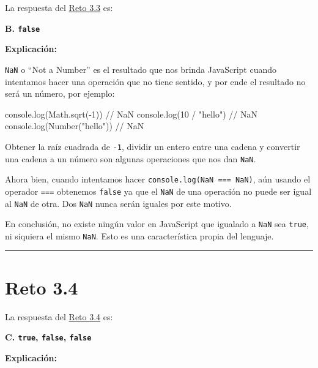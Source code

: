 \documentclass[
  letterpaper,
  DIV=11,
  numbers=noendperiod]{scrreprt}
\newenvironment{Shaded}{\begin{snugshade}}{\end{snugshade}}
\newcommand{\BuiltInTok}[1]{\textcolor[rgb]{0.00,0.23,0.31}{#1}}
\newcommand{\CommentTok}[1]{\textcolor[rgb]{0.37,0.37,0.37}{#1}}
\newcommand{\DecValTok}[1]{\textcolor[rgb]{0.68,0.00,0.00}{#1}}
\newcommand{\FunctionTok}[1]{\textcolor[rgb]{0.28,0.35,0.67}{#1}}
\newcommand{\NormalTok}[1]{\textcolor[rgb]{0.00,0.23,0.31}{#1}}
\newcommand{\OperatorTok}[1]{\textcolor[rgb]{0.37,0.37,0.37}{#1}}
\newcommand{\StringTok}[1]{\textcolor[rgb]{0.13,0.47,0.30}{#1}}
\begin{document}
La respuesta del \hyperref[sec-cap3-reto3]{Reto 3.3} es:

\textbf{B. \texttt{false}}

\textbf{Explicación:}

\texttt{NaN} o ``Not a Number'' es el resultado que nos brinda
JavaScript cuando intentamos hacer una operación que no tiene sentido, y
por ende el resultado no será un número, por ejemplo:

\begin{Shaded}
\begin{Highlighting}[]
\BuiltInTok{console}\OperatorTok{.}\FunctionTok{log}\NormalTok{(}\BuiltInTok{Math}\OperatorTok{.}\FunctionTok{sqrt}\NormalTok{(}\OperatorTok{{-}}\DecValTok{1}\NormalTok{)) }\CommentTok{// NaN}
\BuiltInTok{console}\OperatorTok{.}\FunctionTok{log}\NormalTok{(}\DecValTok{10} \OperatorTok{/} \StringTok{"hello"}\NormalTok{) }\CommentTok{// NaN}
\BuiltInTok{console}\OperatorTok{.}\FunctionTok{log}\NormalTok{(}\BuiltInTok{Number}\NormalTok{(}\StringTok{"hello"}\NormalTok{)) }\CommentTok{// NaN}
\end{Highlighting}
\end{Shaded}

Obtener la raíz cuadrada de \texttt{-1}, dividir un entero entre una
cadena y convertir una cadena a un número son algunas operaciones que
nos dan \texttt{NaN}.

Ahora bien, cuando intentamos hacer \texttt{console.log(NaN\ ===\ NaN)},
aún usando el operador \texttt{===} obtenemos \texttt{false} ya que el
\texttt{NaN} de una operación no puede ser igual al \texttt{NaN} de
otra. Dos \texttt{NaN} nunca serán iguales por este motivo.

En conclusión, no existe ningún valor en JavaScript que igualado a
\texttt{NaN} sea \texttt{true}, ni siquiera el mismo \texttt{NaN}. Esto
es una característica propia del lenguaje.

\begin{center}\rule{0.5\linewidth}{0.5pt}\end{center}

\section{Reto 3.4}\label{sec-sol-cap3-reto4}

La respuesta del \hyperref[sec-cap3-reto4]{Reto 3.4} es:

\textbf{C. \texttt{true}, \texttt{false}, \texttt{false}}

\textbf{Explicación:}
\end{document}
